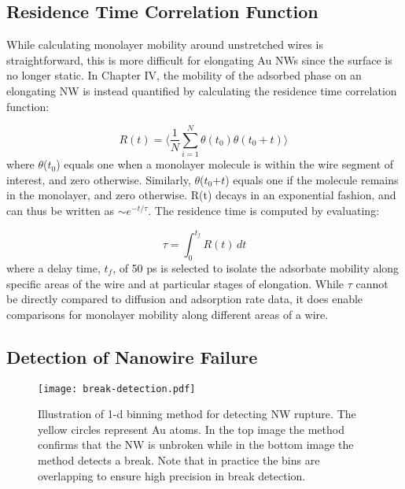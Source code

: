 \documentclass[10pt]{report}  %
\newcommand\findent{\hspace*{\parindent}}
\begin{document}
\subsection{Residence Time Correlation Function}

\findent While calculating monolayer mobility around unstretched wires is straightforward, this is more difficult for elongating Au NWs since the surface is no longer static.  In Chapter IV, the mobility of the adsorbed phase on an elongating NW is instead quantified by calculating the residence time correlation function: \cite{Yang:2010}  

\begin{equation}R(t)= \Bigg\langle \frac{1}{N}\sum_{i=1}^{N}\theta(t_{0})\theta(t_{0}+t) \Bigg\rangle \,\label{residence_correlation}\end{equation} where $\theta$($t_{0}$) equals one when a monolayer molecule is within the wire segment of interest, and zero otherwise. Similarly, $\theta$($t_{0}$+$t$) equals one if the molecule remains in the monolayer, and zero otherwise. R(t) decays in an exponential fashion, and can thus be written as $\sim$$e^{-t/\tau}$.  The residence time is computed by evaluating:

\begin{equation}\tau = \int_{0}^{t_f} \! R(t) \, dt\label{diffusion}\end{equation} where a delay time, $t_{f}$, of 50 ps is selected to isolate the adsorbate mobility along specific areas of the wire and at particular stages of elongation.  While $\tau$ cannot be directly compared to diffusion and adsorption rate data, it does enable comparisons for monolayer mobility along different areas of a wire.

\subsection{Detection of Nanowire Failure}

\begin{figure}[t!]
	\centering
	\texttt{[image: break-detection.pdf]}
	\caption{Illustration of 1-d binning method for detecting NW rupture. The yellow circles represent Au atoms. In the top image the method confirms that the NW is unbroken while in the bottom image the method detects a break.  Note that in practice the bins are overlapping to ensure high precision in break detection. }
	\label{fig:break-detection}
\end{figure}
\end{document}
